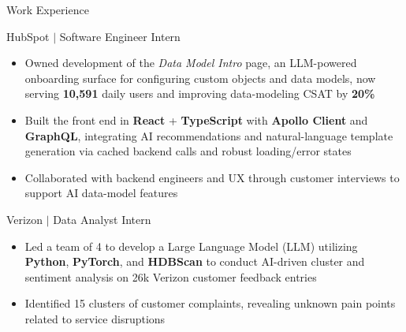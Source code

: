 \documentclass{article}
\newlength{\tabin}
\newlength{\secsep}
\newcommand{\lineunder}{\vspace*{-8pt} \\ \hspace*{-6pt} \hrulefill \\ \vspace*{-15pt}}
\newenvironment{tabbedsection}[1]{
  \begin{list}{}{
      \setlength{\itemsep}{0pt}
      \setlength{\labelsep}{0pt}
      \setlength{\labelwidth}{0pt}
      \setlength{\leftmargin}{\tabin}
      \setlength{\rightmargin}{\tabin}
      \setlength{\listparindent}{0pt}
      \setlength{\parsep}{0pt}
      \setlength{\parskip}{0pt}
      \setlength{\partopsep}{0pt}
      \setlength{\topsep}{#1}
    }
  \item[]
}{\end{list}}
\newenvironment{resume_section}[1]{
  \filbreak
  \vspace{2\secsep}
  \textsc{\large#1}
  \lineunder
  \begin{tabbedsection}{\secsep}
}{\end{tabbedsection}}
\newenvironment{resume_subsection}[2][]{
  \textbf{#2} \hfill {\footnotesize #1} \hspace{-3em}
  \begin{tabbedsection}{0.5\secsep}
}{\end{tabbedsection}}
\newenvironment{subitems}{
  \renewcommand{\labelitemi}{-}
  \begin{itemize}
      \setlength{\labelsep}{1em}
      \fontsize{10.4pt}{11pt}\selectfont
}{\end{itemize}}
\begin{document}
\begin{resume_section}{Work Experience}
    \begin{resume_subsection}{HubSpot $|$ Software Engineer Intern}
        \begin{subitems}
    \item Owned development of the \textit{Data Model Intro} page, an LLM-powered onboarding surface for configuring custom objects and data models, now serving \textbf{10,591} daily users and improving data-modeling CSAT by \textbf{20\%}
    \item Built the front end in \textbf{React} + \textbf{TypeScript} with \textbf{Apollo Client} and \textbf{GraphQL}, integrating AI recommendations and natural-language template generation via cached backend calls and robust loading/error states
    \item Collaborated with backend engineers and UX through customer interviews to support AI data-model features
  \end{subitems}
    \end{resume_subsection}

    \begin{resume_subsection}{Verizon $|$ Data Analyst Intern}
        \begin{subitems}
            \item Led a team of 4 to develop a Large Language Model (LLM) utilizing \textbf{Python}, \textbf{PyTorch}, and \textbf{HDBScan} to conduct AI-driven cluster and sentiment analysis on 26k Verizon customer feedback entries
            \item Identified 15 clusters of customer complaints, revealing unknown pain points related to service disruptions
        \end{subitems}
    \end{resume_subsection}



\end{resume_section}
\end{document}
